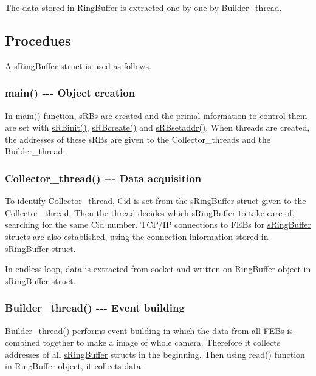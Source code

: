 The data stored in Ring\+Buffer is extracted one by one by Builder\+\_\+thread.\hypertarget{structs_ring_buffer_SRB_PROC}{}\subsection{Procedues}\label{structs_ring_buffer_SRB_PROC}
A \hyperlink{structs_ring_buffer}{s\+Ring\+Buffer} struct is used as follows.\hypertarget{structs_ring_buffer_SRB_CREATION}{}\subsubsection{main() -\/-\/-\/ Object creation}\label{structs_ring_buffer_SRB_CREATION}
In \hyperlink{_master_8cpp_a3c04138a5bfe5d72780bb7e82a18e627}{main()} function, s\+R\+Bs are created and the primal information to control them are set with \hyperlink{_master_8cpp_afdfe90600cb22da97e4a38a3a7245c0d}{s\+R\+Binit()}, \hyperlink{_master_8cpp_a2bc96e14aff905cfba14c80aa9fc6bc1}{s\+R\+Bcreate()} and \hyperlink{_master_8cpp_add67bfd9f7cbc6a394d0d61a41e57ec5}{s\+R\+Bsetaddr()}. When threads are created, the addresses of these s\+R\+Bs are given to the Collector\+\_\+threads and the Builder\+\_\+thread.\hypertarget{structs_ring_buffer_SRB_COLL}{}\subsubsection{Collector\+\_\+thread() -\/-\/-\/ Data acquisition}\label{structs_ring_buffer_SRB_COLL}
To identify Collector\+\_\+thread, Cid is set from the \hyperlink{structs_ring_buffer}{s\+Ring\+Buffer} struct given to the Collector\+\_\+thread. Then the thread decides which \hyperlink{structs_ring_buffer}{s\+Ring\+Buffer} to take care of, searching for the same Cid number. T\+C\+P/\+I\+P connections to F\+E\+Bs for \hyperlink{structs_ring_buffer}{s\+Ring\+Buffer} structs are also established, using the connection information stored in \hyperlink{structs_ring_buffer}{s\+Ring\+Buffer} struct.

In endless loop, data is extracted from socket and written on Ring\+Buffer object in \hyperlink{structs_ring_buffer}{s\+Ring\+Buffer} struct.\hypertarget{structs_ring_buffer_SRB_BLD}{}\subsubsection{Builder\+\_\+thread() -\/-\/-\/ Event building}\label{structs_ring_buffer_SRB_BLD}
\hyperlink{_master_8cpp_a435b26afa480ba18cbef3620d0eccee2}{Builder\+\_\+thread()} performs event building in which the data from all F\+E\+Bs is combined together to make a image of whole camera. Therefore it collects addresses of all \hyperlink{structs_ring_buffer}{s\+Ring\+Buffer} structs in the beginning. Then using read() function in Ring\+Buffer object, it collects data. 

